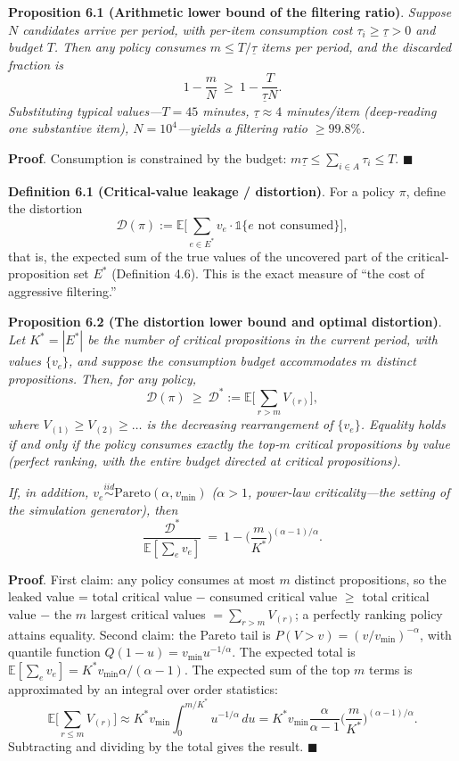 \documentclass[
  11pt]{article}
\begin{document}
\textbf{Proposition 6.1 (Arithmetic lower bound of the filtering
ratio)}. \emph{Suppose \(N\) candidates arrive per period, with per-item
consumption cost \(\tau_i \ge \underline\tau > 0\) and budget \(T\).
Then any policy consumes \(m \le T/\underline\tau\) items per period,
and the discarded fraction is}
\[1 - \frac{m}{N} \ \ge\ 1 - \frac{T}{\underline\tau N}.\]
\emph{Substituting typical values---\(T = 45\) minutes,
\(\underline\tau \approx 4\) minutes/item (deep-reading one substantive
item), \(N = 10^4\)---yields a filtering ratio \(\ge 99.8\%\).}

\textbf{Proof}. Consumption is constrained by the budget:
\(m\underline\tau \le \sum_{i\in A}\tau_i \le T\). \(\blacksquare\)

\textbf{Definition 6.1 (Critical-value leakage / distortion)}. For a
policy \(\pi\), define the distortion
\[\mathcal{D}(\pi) := \mathbb{E}\Big[\sum_{e \in E^*} v_e \cdot \mathbb{1}\{e \text{ not consumed}\}\Big],\]
that is, the expected sum of the true values of the uncovered part of
the critical-proposition set \(E^*\) (Definition 4.6). This is the exact
measure of ``the cost of aggressive filtering.''

\textbf{Proposition 6.2 (The distortion lower bound and optimal
distortion)}. \emph{Let \(K^* = |E^*|\) be the number of critical
propositions in the current period, with values \(\{v_e\}\), and suppose
the consumption budget accommodates \(m\) distinct propositions. Then,
for any policy,}
\[\mathcal{D}(\pi) \ \ge\ \mathcal{D}^* := \mathbb{E}\Big[\sum_{r > m} V_{(r)}\Big],\]
\emph{where \(V_{(1)} \ge V_{(2)} \ge \dots\) is the decreasing
rearrangement of \(\{v_e\}\). Equality holds if and only if the policy
consumes exactly the top-\(m\) critical propositions by value (perfect
ranking, with the entire budget directed at critical propositions).}

\emph{If, in addition,
\(v_e \stackrel{iid}{\sim} \mathrm{Pareto}(\alpha, v_{\min})\)
(\(\alpha > 1\), power-law criticality---the setting of the simulation
generator), then}
\[\frac{\mathcal{D}^*}{\mathbb{E}[\sum_e v_e]} \ =\ 1 - \Big(\frac{m}{K^*}\Big)^{(\alpha-1)/\alpha}.\]

\textbf{Proof}. First claim: any policy consumes at most \(m\) distinct
propositions, so the leaked value = total critical value − consumed
critical value \(\ge\) total critical value − the \(m\) largest critical
values \(= \sum_{r>m} V_{(r)}\); a perfectly ranking policy attains
equality. Second claim: the Pareto tail is
\(P(V > v) = (v/v_{\min})^{-\alpha}\), with quantile function
\(Q(1-u) = v_{\min} u^{-1/\alpha}\). The expected total is
\(\mathbb{E}[\sum_e v_e] = K^* v_{\min} \alpha/(\alpha - 1)\). The
expected sum of the top \(m\) terms is approximated by an integral over
order statistics:
\[\mathbb{E}\Big[\sum_{r \le m} V_{(r)}\Big] \approx K^* v_{\min} \int_0^{m/K^*} u^{-1/\alpha}\, du = K^* v_{\min} \frac{\alpha}{\alpha-1}\Big(\frac{m}{K^*}\Big)^{(\alpha-1)/\alpha}.\]
Subtracting and dividing by the total gives the result. \(\blacksquare\)
\end{document}
